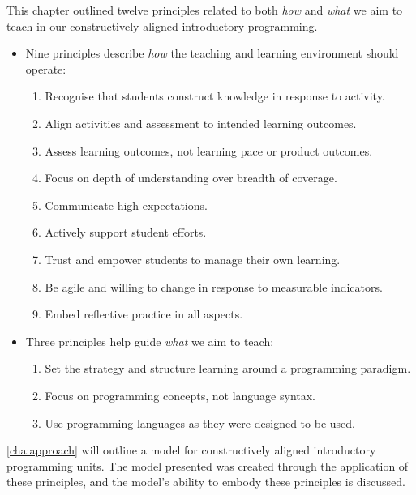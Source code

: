 This chapter outlined twelve principles related to both \emph{how} and \emph{what} we aim to teach in our constructively aligned introductory programming.
\begin{itemize}[noitemsep,nolistsep]
	\item Nine principles describe \emph{how} the teaching and learning environment should operate:
	\begin{enumerate}
		\item \label{itm:construct} Recognise that students construct knowledge in response to activity.
		\item \label{itm:align} Align activities and assessment to intended learning outcomes.
		\item \label{itm:formative} Assess learning outcomes, not learning pace or product outcomes.
		\item \label{itm:depth} Focus on depth of understanding over breadth of coverage.
		\item \label{itm:expectations} Communicate high expectations.
		\item \label{itm:support} Actively support student efforts.
		\item \label{itm:theory_y} Trust and empower students to manage their own learning.
		\item \label{itm:agile} Be agile and willing to change in response to measurable indicators.
		\item \label{itm:reflect} Embed reflective practice in all aspects.
	\end{enumerate}
	\item Three principles help guide \emph{what} we aim to teach:
	\begin{enumerate}[start=10,noitemsep,nolistsep]
		\item \label{itm:paradigm} Set the strategy and structure learning around a programming paradigm.
		\item \label{itm:concepts} Focus on programming concepts, not language syntax.
		\item \label{itm:authentic} Use programming languages as they were designed to be used.
	\end{enumerate}
\end{itemize}

\cref{cha:approach} will outline a model for constructively aligned introductory programming units. The model presented was created through the application of these principles, and the model's ability to embody these principles is discussed.


